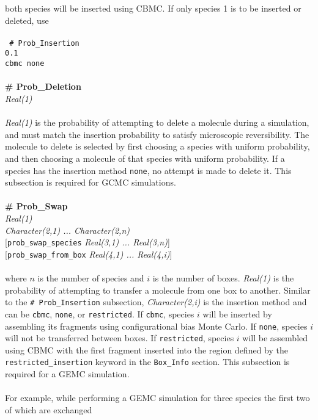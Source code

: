 both species will be inserted using CBMC.
If only species 1 is to be inserted or deleted, use \\ \\
%
\texttt{
\# Prob\_Insertion \\
0.1 \\
cbmc none} \\ \\
%
%
%
{\bf \# Prob\_Deletion} \\
{\it Real(1)} \\ \\
%
{\it Real(1)} is the probability of attempting to delete a molecule during a simulation,
and must match the insertion probability to satisfy microscopic reversibility.
The molecule to delete is selected by first choosing a species with uniform probability,
and then choosing a molecule of that species with uniform probability.
If a species has the insertion method \texttt{none}, no attempt is made to delete it.
This subsection is required for GCMC simulations. \\ \\
%
%
%
{\bf \# Prob\_Swap}\\
{\it Real(1)} \\
{\it Character(2,1) ... Character(2,n)} \\
{[}{\tt prob\_swap\_species} {\it Real(3,1) ... Real(3,n)}] \\
{[}{\tt prob\_swap\_from\_box} {\it Real(4,1) ... Real(4,i)}] \\ \\
%
where $n$ is the number of species and $i$ is the number of boxes.
{\em Real(1)} is the probability of attempting to transfer a molecule from one box to another.
Similar to the \texttt{\# Prob\_Insertion} subsection,
{\em Character(2,i)} is the insertion method and can be
\texttt{cbmc}, \texttt{none}, or \texttt{restricted}.
If \texttt{cbmc}, species $i$ will be inserted by assembling its
fragments using configurational bias Monte Carlo.
If \texttt{none}, species $i$ will not be transferred between boxes.
If \texttt{restricted}, species $i$ will be assembled using CBMC
with the first fragment inserted into the region defined by
the \texttt{restricted\_insertion} keyword in the \texttt{Box\_Info} section.
This subsection is required for a GEMC simulation. \\ \\
%
For example, while performing a GEMC simulation for three species the first two of which are exchanged
